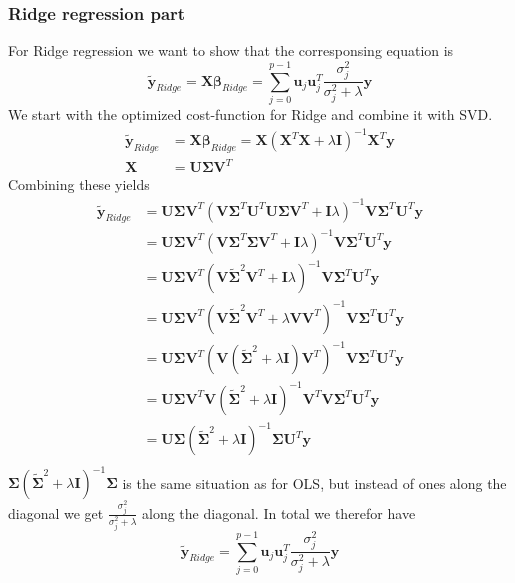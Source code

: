 \documentclass{article}
\begin{document}
\subsubsection*{Ridge regression part} 
For Ridge regression we want to show that the corresponsing equation is
$$\bm{\tilde{y}}_{Ridge} = \mathbf{X}\bm{\beta}_{Ridge} = \sum_{j=0}^{p-1}\bm{u}_{j}\bm{u}_{j}^{T} \frac{\sigma_{j}^{2}}{\sigma_{j}^2 + \lambda} \bm{y}$$
We start with the optimized cost-function for Ridge and combine it with SVD. 
\begin{align*}
    \bm{\tilde{y}}_{Ridge} &= \mathbf{X}\bm{\beta}_{Ridge} = \mathbf{X}(\mathbf{X}^{T}\mathbf{X} + \lambda\mathbf{I})^{-1}\mathbf{X}^{T}\bm{y} \\
    \mathbf{X} &= \mathbf{U}\bm{\Sigma}\mathbf{V}^{T}
\end{align*}
Combining these yields
\begin{align*}
    \bm{\tilde{y}}_{Ridge} &= \mathbf{U}\bm{\Sigma}\mathbf{V}^{T}(\mathbf{V}\bm{\Sigma}^{T}\mathbf{U}^{T}\mathbf{U}\bm{\Sigma}\mathbf{V}^{T} + \mathbf{I}\lambda)^{-1}\mathbf{V}\mathbf{\Sigma}^{T}\mathbf{U}^{T}\bm{y} \\
    &= \mathbf{U}\bm{\Sigma}\mathbf{V}^{T}(\mathbf{V}\bm{\Sigma}^{T}\bm{\Sigma}\mathbf{V}^{T} + \mathbf{I}\lambda)^{-1}\mathbf{V}\mathbf{\Sigma}^{T}\mathbf{U}^{T}\bm{y} \\ 
    &= \mathbf{U}\bm{\Sigma}\mathbf{V}^{T}(\mathbf{V}\bm{\tilde{\Sigma}}^{2}\mathbf{V}^{T} + \mathbf{I}\lambda)^{-1}\mathbf{V}\mathbf{\Sigma}^{T}\mathbf{U}^{T}\bm{y} \\
    &= \mathbf{U}\bm{\Sigma}\mathbf{V}^{T}(\mathbf{V}\bm{\tilde{\Sigma}}^{2}\mathbf{V}^{T} + \lambda\mathbf{V}\mathbf{V}^{T})^{-1}\mathbf{V}\mathbf{\Sigma}^{T}\mathbf{U}^{T}\bm{y} \\
    &= \mathbf{U}\bm{\Sigma}\mathbf{V}^{T}(\mathbf{V}(\bm{\tilde{\Sigma}}^{2} + \lambda\mathbf{I})\mathbf{V}^{T})^{-1}\mathbf{V}\mathbf{\Sigma}^{T}\mathbf{U}^{T}\bm{y} \\
    &= \mathbf{U}\bm{\Sigma}\mathbf{V}^{T}\mathbf{V}(\bm{\tilde{\Sigma}}^{2} + \lambda\mathbf{I})^{-1}\mathbf{V}^{T}\mathbf{V}\mathbf{\Sigma}^{T}\mathbf{U}^{T}\bm{y} \\
    &= \mathbf{U}\bm{\Sigma}(\bm{\tilde{\Sigma}}^{2} + \lambda\mathbf{I})^{-1}\mathbf{\Sigma}\mathbf{U}^{T}\bm{y} \\
\end{align*} 
$\bm{\Sigma}(\bm{\tilde{\Sigma}}^{2} + \lambda\mathbf{I})^{-1}\bm{\Sigma}$ is the same situation as for OLS, but
instead of ones along the diagonal we get $\frac{\sigma_{j}^{2}}{\sigma_{j}^2 + \lambda}$ along the diagonal. 
In total we therefor have
$$\bm{\tilde{y}}_{Ridge} = \sum_{j=0}^{p-1}\bm{u}_{j}\bm{u}_{j}^{T} \frac{\sigma_{j}^{2}}{\sigma_{j}^2 + \lambda} \bm{y}$$
\end{document}
